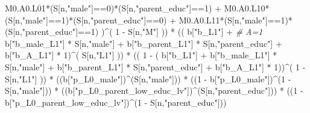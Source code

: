 \documentclass[
]{book}
\newenvironment{Shaded}{\begin{snugshade}}{\end{snugshade}}
\newcommand{\CommentTok}[1]{\textcolor[rgb]{0.56,0.35,0.01}{\textit{#1}}}
\newcommand{\DecValTok}[1]{\textcolor[rgb]{0.00,0.00,0.81}{#1}}
\newcommand{\NormalTok}[1]{#1}
\newcommand{\SpecialCharTok}[1]{\textcolor[rgb]{0.00,0.00,0.00}{#1}}
\newcommand{\StringTok}[1]{\textcolor[rgb]{0.31,0.60,0.02}{#1}}
\begin{document}
\begin{Shaded}
\begin{Highlighting}[]
\NormalTok{          M0.A0.L01}\SpecialCharTok{*}\NormalTok{(S[n,}\StringTok{"male"}\NormalTok{]}\SpecialCharTok{==}\DecValTok{0}\NormalTok{)}\SpecialCharTok{*}\NormalTok{(S[n,}\StringTok{"parent\_educ"}\NormalTok{]}\SpecialCharTok{==}\DecValTok{1}\NormalTok{) }\SpecialCharTok{+}
\NormalTok{          M0.A0.L10}\SpecialCharTok{*}\NormalTok{(S[n,}\StringTok{"male"}\NormalTok{]}\SpecialCharTok{==}\DecValTok{1}\NormalTok{)}\SpecialCharTok{*}\NormalTok{(S[n,}\StringTok{"parent\_educ"}\NormalTok{]}\SpecialCharTok{==}\DecValTok{0}\NormalTok{) }\SpecialCharTok{+} 
\NormalTok{          M0.A0.L11}\SpecialCharTok{*}\NormalTok{(S[n,}\StringTok{"male"}\NormalTok{]}\SpecialCharTok{==}\DecValTok{1}\NormalTok{)}\SpecialCharTok{*}\NormalTok{(S[n,}\StringTok{"parent\_educ"}\NormalTok{]}\SpecialCharTok{==}\DecValTok{1}\NormalTok{) )}\SpecialCharTok{\^{}}\NormalTok{( }\DecValTok{1} \SpecialCharTok{{-}}\NormalTok{ S[n,}\StringTok{"M"}\NormalTok{] )) }\SpecialCharTok{*}
\NormalTok{      (( b[}\StringTok{"b\_L1"}\NormalTok{] }\SpecialCharTok{+}                                                            \CommentTok{\# A=1}
\NormalTok{           b[}\StringTok{"b\_male\_L1"}\NormalTok{] }\SpecialCharTok{*}\NormalTok{ S[n,}\StringTok{"male"}\NormalTok{] }\SpecialCharTok{+}  
\NormalTok{           b[}\StringTok{"b\_parent\_L1"}\NormalTok{] }\SpecialCharTok{*}\NormalTok{ S[n,}\StringTok{"parent\_educ"}\NormalTok{] }\SpecialCharTok{+}
\NormalTok{           b[}\StringTok{"b\_A\_L1"}\NormalTok{] }\SpecialCharTok{*} \DecValTok{1}\NormalTok{)}\SpecialCharTok{\^{}}\NormalTok{( S[n,}\StringTok{"L1"}\NormalTok{] )) }\SpecialCharTok{*}
\NormalTok{      (( }\DecValTok{1} \SpecialCharTok{{-}}\NormalTok{ ( b[}\StringTok{"b\_L1"}\NormalTok{] }\SpecialCharTok{+}
\NormalTok{                 b[}\StringTok{"b\_male\_L1"}\NormalTok{] }\SpecialCharTok{*}\NormalTok{ S[n,}\StringTok{"male"}\NormalTok{] }\SpecialCharTok{+}  
\NormalTok{                 b[}\StringTok{"b\_parent\_L1"}\NormalTok{] }\SpecialCharTok{*}\NormalTok{ S[n,}\StringTok{"parent\_educ"}\NormalTok{] }\SpecialCharTok{+}
\NormalTok{                 b[}\StringTok{"b\_A\_L1"}\NormalTok{] }\SpecialCharTok{*} \DecValTok{1}\NormalTok{))}\SpecialCharTok{\^{}}\NormalTok{( }\DecValTok{1} \SpecialCharTok{{-}}\NormalTok{ S[n,}\StringTok{"L1"}\NormalTok{] )) }\SpecialCharTok{*}
\NormalTok{      ((b[}\StringTok{"p\_L0\_male"}\NormalTok{])}\SpecialCharTok{\^{}}\NormalTok{(S[n,}\StringTok{"male"}\NormalTok{])) }\SpecialCharTok{*} 
\NormalTok{      ((}\DecValTok{1} \SpecialCharTok{{-}}\NormalTok{ b[}\StringTok{"p\_L0\_male"}\NormalTok{])}\SpecialCharTok{\^{}}\NormalTok{(}\DecValTok{1} \SpecialCharTok{{-}}\NormalTok{ S[n,}\StringTok{"male"}\NormalTok{])) }\SpecialCharTok{*} 
\NormalTok{      ((b[}\StringTok{"p\_L0\_parent\_low\_educ\_lv"}\NormalTok{])}\SpecialCharTok{\^{}}\NormalTok{(S[n,}\StringTok{"parent\_educ"}\NormalTok{])) }\SpecialCharTok{*}
\NormalTok{      ((}\DecValTok{1} \SpecialCharTok{{-}}\NormalTok{ b[}\StringTok{"p\_L0\_parent\_low\_educ\_lv"}\NormalTok{])}\SpecialCharTok{\^{}}\NormalTok{(}\DecValTok{1} \SpecialCharTok{{-}}\NormalTok{ S[n,}\StringTok{"parent\_educ"}\NormalTok{])) }
    

\end{Highlighting}
\end{Shaded}
\end{document}
